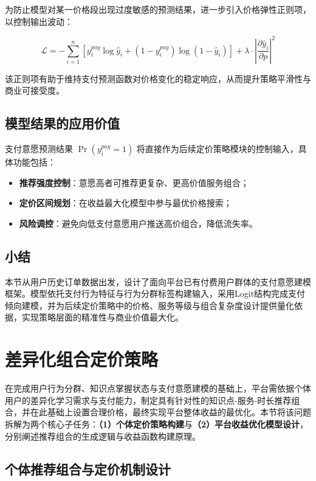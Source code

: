 为防止模型对某一价格段出现过度敏感的预测结果，进一步引入价格弹性正则项，以控制输出波动：

\begin{equation}
\mathcal{L} = -\sum_{i=1}^{n} \left[ y_i^{pay} \log \hat{y}_i + (1 - y_i^{pay}) \log(1 - \hat{y}_i) \right] + \lambda \cdot \left| \frac{\partial \hat{y}_i}{\partial p} \right|^2
\end{equation}

该正则项有助于维持支付预测函数对价格变化的稳定响应，从而提升策略平滑性与商业可接受度。

\subsection{模型结果的应用价值}

支付意愿预测结果 $\Pr(y_i^{pay} = 1)$ 将直接作为后续定价策略模块的控制输入，具体功能包括：

\begin{itemize}
  \item \textbf{推荐强度控制}：意愿高者可推荐更复杂、更高价值服务组合；
  \item \textbf{定价区间规划}：在收益最大化模型中参与最优价格搜索；
  \item \textbf{风险调控}：避免向低支付意愿用户推送高价组合，降低流失率。
\end{itemize}

\subsection*{小结}

本节从用户历史订单数据出发，设计了面向平台已有付费用户群体的支付意愿建模框架。模型依托支付行为特征与行为分群标签构建输入，采用Logit结构完成支付倾向建模，并为后续定价策略中的价格、服务等级与组合复杂度设计提供量化依据，实现策略层面的精准性与商业价值最大化。
\section{差异化组合定价策略}
\label{sec:差异化组合定价策略}

在完成用户行为分群、知识点掌握状态与支付意愿建模的基础上，平台需依据个体用户的差异化学习需求与支付能力，制定具有针对性的知识点-服务-时长推荐组合，并在此基础上设置合理价格，最终实现平台整体收益的最优化。本节将该问题拆解为两个核心子任务：\textbf{（1）个体定价策略构建}与\textbf{（2）平台收益优化模型设计}，分别阐述推荐组合的生成逻辑与收益函数构建原理。

\subsection{个体推荐组合与定价机制设计}
\label{sec:sub_定价策略设计}

